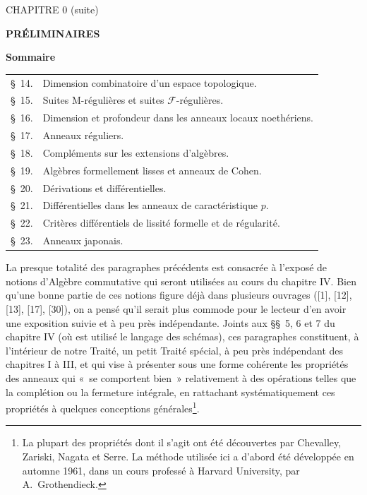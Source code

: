\clearpage
\thispagestyle{plain}
\label{chapter:0IV1-fr}

\begin{center}
{\large CHAPITRE 0 (suite)\footnotemark\par}
\vspace{1.5em}
{\Large\bfseries PRÉLIMINAIRES\par}
\vspace{2em}
{\large\bfseries Sommaire\par}
\end{center}


\begin{center}
\begin{tabular}{@{}r l@{}}
\S~14. & Dimension combinatoire d'un espace topologique.\\
\S~15. & Suites M-régulières et suites $\mathscr F$-régulières.\\
\S~16. & Dimension et profondeur dans les anneaux locaux noethériens.\\
\S~17. & Anneaux réguliers.\\
\S~18. & Compléments sur les extensions d'algèbres.\\
\S~19. & Algèbres formellement lisses et anneaux de Cohen.\\
\S~20. & Dérivations et différentielles.\\
\S~21. & Différentielles dans les anneaux de caractéristique $p$.\\
\S~22. & Critères différentiels de lissité formelle et de régularité.\\
\S~23. & Anneaux japonais.
\end{tabular}
\end{center}

La presque totalité des paragraphes précédents est consacrée à l'exposé de
notions d'Algèbre commutative qui seront utilisées au cours du chapitre IV.
Bien qu'une bonne partie de ces notions figure déjà dans plusieurs ouvrages
([1], [12], [13], [17], [30]), on a pensé qu'il serait plus commode pour le
lecteur d'en avoir une exposition suivie et à peu près indépendante. Joints
aux \S\S~5, 6 et 7 du chapitre IV (où est utilisé le langage des schémas), ces
paragraphes constituent, à l'intérieur de notre Traité, un petit Traité
spécial, à peu près indépendant des chapitres I à III, et qui vise à présenter
sous une forme cohérente les propriétés des anneaux qui «~se comportent bien~»
relativement à des opérations telles que la complétion ou la fermeture
intégrale, en rattachant systématiquement ces propriétés à quelques
conceptions générales\footnote{La plupart des propriétés dont il s'agit ont
été découvertes par Chevalley, Zariski, Nagata et Serre. La méthode utilisée
ici a d'abord été développée en automne 1961, dans un cours professé à Harvard
University, par A.~Grothendieck.}.

